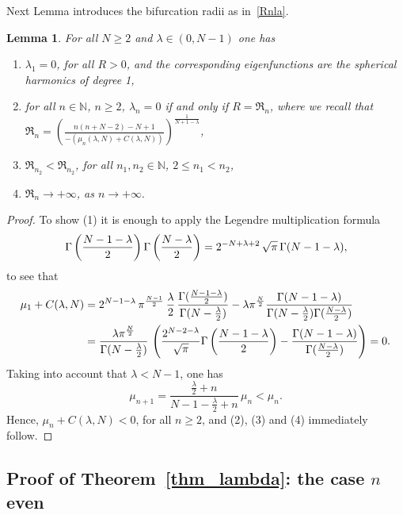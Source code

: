 \documentclass[10pt,reqno,english]{amsart}
\newcommand{\N}{\mathbb{N}}
\newcommand{\la}{\lambda}
\newtheorem{lemma}{Lemma}[section]
\theoremstyle{definition}
\numberwithin{equation}{section}
\begin{document}
Next Lemma introduces the bifurcation radii as in~\eqref{Rnla}.

\begin{lemma}
\label{lemma:autov}
For all $N\ge2$ and $\lambda\in (0,N-1)$ one has
\begin{enumerate}
\item $\lambda_1=0$, for all $R>0$, and the corresponding eigenfunctions are the spherical harmonics of degree 1,
\item for all $n\in\N$, $n\ge2$, $\lambda_n=0$ if and only if $R=\mathfrak R_n$, where we recall that $\mathfrak R_n=\left(\frac{n(n+N-2)-N+1}{-(\mu_n (\lambda , N)+C({\lambda},N))}\right)^{\frac{1}{N+1-\lambda}}$,
\item $\mathfrak R_{n_2}<\mathfrak R_{n_2}$, for all  $n_1,n_2\in\N$, $2\le n_1<n_2$,
\item $\mathfrak R_n\to+\infty$, as $n\to+\infty.$
\end{enumerate}
\end{lemma}
\begin{proof}
To show (1) it is enough to apply the Legendre multiplication formula
\begin{equation}
\label{x}
    \Gamma \left({N-1 -\lambda \over 2} \right) \Gamma \left({N -\lambda \over 2} \right) = 2^{-N +\lambda +2} \, \sqrt{\pi} \, \Gamma (N-1-\lambda ),
 \end{equation}
 to see that
 \begin{align*}
    \mu_1+C (\lambda, N)&= 2^{N-1-\lambda} \, \pi^{N-1 \over 2} \, {\lambda \over 2} \,  {\Gamma ({N-1-\lambda \over 2}) \over \Gamma (N -{\lambda \over 2} )} -\lambda\pi^{\frac N2}\frac{\Gamma(N-1-\lambda)}{ \Gamma (N -{\lambda \over 2})\Gamma(\frac{N-\lambda}{2})} \\
    &= {\la \pi^{N \over 2} \over \Gamma (N-{\lambda \over 2})} \, \left( {2^{N-2-\lambda} \over \sqrt{\pi}} \Gamma \left({N-1-\lambda \over 2}\right) - \frac{\Gamma(N-1-\lambda)}{ \Gamma(\frac{N-\lambda}{2})} \right) =0.
\end{align*}
Taking into account that $\lambda<N-1$, one has
\[
\mu_{n+1}=\frac{\frac\lambda2+n}{N-1-\frac\lambda2+n}\,\mu_n<\mu_n.
\]
Hence, $\mu_n+ C (\lambda, N)<0$, for all $n\ge2$, and (2), (3) and (4) immediately follow. 
\end{proof}

\subsection{Proof of Theorem\texorpdfstring{~\ref{thm_lambda}}{ 3}: the case \texorpdfstring{$n$}{n} even}
\end{document}

